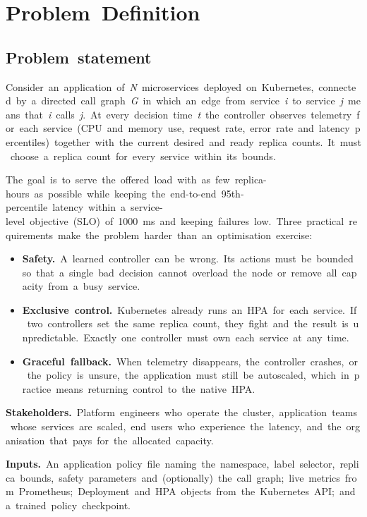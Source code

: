 \documentclass[12pt,a4paper,oneside]{report}
\begin{document}
\clearpage
\chapter{Problem~Definition}\label{chap:problem}

\section{Problem~statement}

Consider~an~application~of~\textit{N}~microservices~deployed~on~Kubernetes,~connected~by~a~directed~call~graph~\textit{G}~in~which~an~edge~from~service~\textit{i}~to~service~\textit{j}~means~that~\textit{i}~calls~\textit{j}.~At~every~decision~time~\textit{t}~the~controller~observes~telemetry~for~each~service~(CPU~and~memory~use,~request~rate,~error~rate~and~latency~percentiles)~together~with~the~current~desired~and~ready~replica~counts.~It~must~choose~a~replica~count~for~every~service~within~its~bounds.


The~goal~is~to~serve~the~offered~load~with~as~few~replica-hours~as~possible~while~keeping~the~end-to-end~95th-percentile~latency~within~a~service-level~objective~(SLO)~of~1000~ms~and~keeping~failures~low.~Three~practical~requirements~make~the~problem~harder~than~an~optimisation~exercise:


\begin{itemize}\setlength{\itemsep}{1pt}
  \item \textbf{Safety.}~A~learned~controller~can~be~wrong.~Its~actions~must~be~bounded~so~that~a~single~bad~decision~cannot~overload~the~node~or~remove~all~capacity~from~a~busy~service.
  \item \textbf{Exclusive~control.}~Kubernetes~already~runs~an~HPA~for~each~service.~If~two~controllers~set~the~same~replica~count,~they~fight~and~the~result~is~unpredictable.~Exactly~one~controller~must~own~each~service~at~any~time.
  \item \textbf{Graceful~fallback.}~When~telemetry~disappears,~the~controller~crashes,~or~the~policy~is~unsure,~the~application~must~still~be~autoscaled,~which~in~practice~means~returning~control~to~the~native~HPA.
\end{itemize}

\textbf{Stakeholders.}~Platform~engineers~who~operate~the~cluster,~application~teams~whose~services~are~scaled,~end~users~who~experience~the~latency,~and~the~organisation~that~pays~for~the~allocated~capacity.


\textbf{Inputs.}~An~application~policy~file~naming~the~namespace,~label~selector,~replica~bounds,~safety~parameters~and~(optionally)~the~call~graph;~live~metrics~from~Prometheus;~Deployment~and~HPA~objects~from~the~Kubernetes~API;~and~a~trained~policy~checkpoint.
\end{document}
